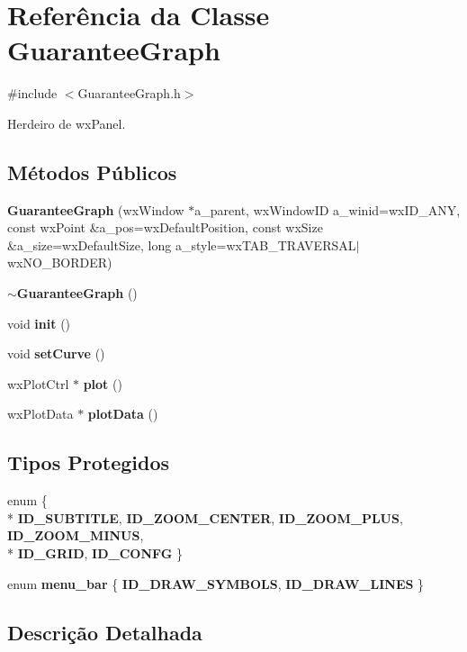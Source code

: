\section{Referência da Classe Guarantee\+Graph}
\label{class_guarantee_graph}


{\ttfamily \#include $<$Guarantee\+Graph.\+h$>$}



Herdeiro de wx\+Panel.

\subsection*{Métodos Públicos}
\begin{DoxyCompactItemize}
\item 
{\bf Guarantee\+Graph} (wx\+Window $\ast$a\+\_\+parent, wx\+Window\+ID a\+\_\+winid=wx\+I\+D\+\_\+\+A\+NY, const wx\+Point \&a\+\_\+pos=wx\+Default\+Position, const wx\+Size \&a\+\_\+size=wx\+Default\+Size, long a\+\_\+style=wx\+T\+A\+B\+\_\+\+T\+R\+A\+V\+E\+R\+S\+AL$\vert$wx\+N\+O\+\_\+\+B\+O\+R\+D\+ER)
\item 
{\bf $\sim$\+Guarantee\+Graph} ()
\item 
void {\bf init} ()
\item 
void {\bf set\+Curve} ()
\item 
wx\+Plot\+Ctrl $\ast$ {\bf plot} ()
\item 
wx\+Plot\+Data $\ast$ {\bf plot\+Data} ()
\end{DoxyCompactItemize}
\subsection*{Tipos Protegidos}
\begin{DoxyCompactItemize}
\item 
enum \{ \\*
{\bf I\+D\+\_\+\+S\+U\+B\+T\+I\+T\+LE}, 
{\bf I\+D\+\_\+\+Z\+O\+O\+M\+\_\+\+C\+E\+N\+T\+ER}, 
{\bf I\+D\+\_\+\+Z\+O\+O\+M\+\_\+\+P\+L\+US}, 
{\bf I\+D\+\_\+\+Z\+O\+O\+M\+\_\+\+M\+I\+N\+US}, 
\\*
{\bf I\+D\+\_\+\+G\+R\+ID}, 
{\bf I\+D\+\_\+\+C\+O\+N\+FG}
 \}
\item 
enum {\bf menu\+\_\+bar} \{ {\bf I\+D\+\_\+\+D\+R\+A\+W\+\_\+\+S\+Y\+M\+B\+O\+LS}, 
{\bf I\+D\+\_\+\+D\+R\+A\+W\+\_\+\+L\+I\+N\+ES}
 \}
\end{DoxyCompactItemize}


\subsection{Descrição Detalhada}


